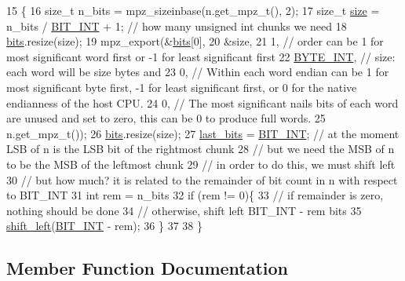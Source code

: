 \begin{DoxyCode}
15                                     \{
16   \textcolor{keywordtype}{size\_t} n\_bits = mpz\_sizeinbase(n.get\_mpz\_t(), 2);
17   \textcolor{keywordtype}{size\_t} \hyperlink{classbit__pipe_a4bdc57f1f598bfad0eaa40860f17000c}{size} = n\_bits / \hyperlink{bitstream_8h_afcadf5aa65c5159bfb96c4d82ebc0a5d}{BIT\_INT} + 1; \textcolor{comment}{// how many unsigned int chunks we need}
18   \hyperlink{classbit__pipe_a86f38af1e9736b053728033490476b50}{bits}.resize(size);
19   mpz\_export(&\hyperlink{classbit__pipe_a86f38af1e9736b053728033490476b50}{bits}[0],
20              &size,
21              1, \textcolor{comment}{// order can be 1 for most significant word first or -1 for least significant first}
22              \hyperlink{bitstream_8h_adcaf4dd854153bb193477f88f921eb36}{BYTE\_INT}, \textcolor{comment}{// size: each word will be size bytes and}
23              0, \textcolor{comment}{// Within each word endian can be 1 for most significant byte first, -1 for least
       significant first, or 0 for the native endianness of the host CPU.}
24              0, \textcolor{comment}{// The most significant nails bits of each word are unused and set to zero, this can be 0
       to produce full words.}
25              n.get\_mpz\_t());
26   \hyperlink{classbit__pipe_a86f38af1e9736b053728033490476b50}{bits}.resize(size);
27   \hyperlink{classbit__pipe_a0f3e84b02751803adaab499b5dad86fe}{last\_bits} = \hyperlink{bitstream_8h_afcadf5aa65c5159bfb96c4d82ebc0a5d}{BIT\_INT}; \textcolor{comment}{// at the moment LSB of n is the LSB bit of the rightmost chunk}
28   \textcolor{comment}{// but we need the MSB of n to be the MSB of the leftmost chunk}
29   \textcolor{comment}{// in order to do this, we must shift left}
30   \textcolor{comment}{// but how much? it is related to the remainder of bit count in n with respect to BIT\_INT}
31   \textcolor{keywordtype}{int} rem = n\_bits %
32   \textcolor{keywordflow}{if} (rem != 0)\{
33     \textcolor{comment}{// if remainder is zero, nothing should be done}
34     \textcolor{comment}{// otherwise, shift left BIT\_INT - rem bits}
35     \hyperlink{classbit__pipe_a148fab2b6b3ee730fbaa52539d5a4d74}{shift\_left}(\hyperlink{bitstream_8h_afcadf5aa65c5159bfb96c4d82ebc0a5d}{BIT\_INT} - rem);
36   \}
37   
38 \}
\end{DoxyCode}


\subsection{Member Function Documentation}
\mbox{\label{classbit__pipe_a0b14715c897cba1713a0ea19ea2996d8}} 
